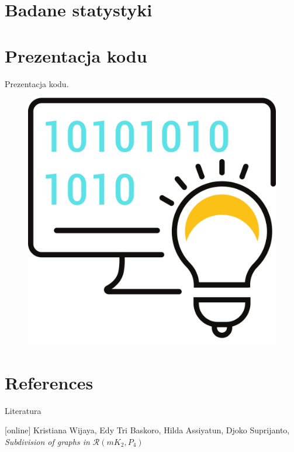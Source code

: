 \documentclass{beamer}
\begin{document}
\section{Badane statystyki}
\begin{frame}
		
\end{frame}
\begin{frame}
	
\end{frame}

\section{Prezentacja kodu}
\begin{frame}
	\begin{center}
		\huge{Prezentacja kodu.}
	\end{center}
	\begin{figure}
		\centering
		\includegraphics[width=0.5\linewidth]{../images/rys_6}
		\label{fig:rys6}
	\end{figure}
\end{frame}







\section{References}
\begin{frame}[allowframebreaks]{Literatura}
\begin{thebibliography}{}
	[online]
	Kristiana Wijaya, Edy Tri Baskoro, Hilda Assiyatun, Djoko Suprijanto, \textit{Subdivision of graphs in $\mathcal{R}(mK_2,P_4)$}
\end{thebibliography}
\end{frame}
\end{document}
